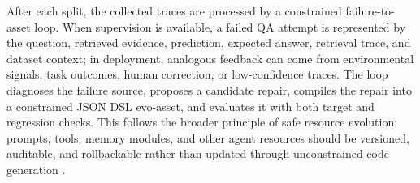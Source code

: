
After each split, the collected traces are processed by a constrained failure-to-asset loop.
When supervision is available, a failed QA attempt is represented by the question, retrieved evidence, prediction, expected answer, retrieval trace, and dataset context; in deployment, analogous feedback can come from environmental signals, task outcomes, human correction, or low-confidence traces.
The loop diagnoses the failure source, proposes a candidate repair, compiles the repair into a constrained JSON DSL evo-asset, and evaluates it with both target and regression checks.
This follows the broader principle of safe resource evolution: prompts, tools, memory modules, and other agent resources should be versioned, auditable, and rollbackable rather than updated through unconstrained code generation \cite{autogenesis}.




